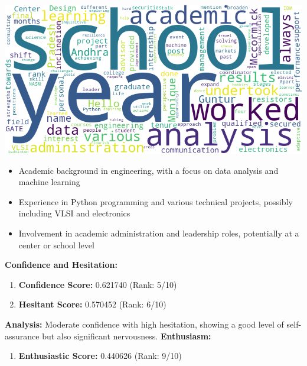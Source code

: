 \documentclass{article}
\begin{document}
\begin{center}
    \includegraphics[width=1\columnwidth]{images/wordcloud_4.png}
\end{center}
\begin{itemize}
    \item Academic background in engineering, with a focus on data analysis and machine learning
    \item Experience in Python programming and various technical projects, possibly including VLSI and electronics
    \item Involvement in academic administration and leadership roles, potentially at a center or school level
\end{itemize}
\vspace{0.1in}
\large{\textbf{Confidence and Hesitation:}}
\begin{tcolorbox}[title=Confidence and Hesitant Scores]
    \begin{enumerate}
        \item \textbf{Confidence Score:} \textcolor{green!50!black}{0.621740} (Rank: 5/10)
        \item \textbf{Hesitant Score:} \textcolor{red!70!black}{0.570452} (Rank: 6/10)
    \end{enumerate}
\end{tcolorbox}
    \textbf{Analysis:} Moderate confidence with high hesitation, showing a good level of self-assurance but also significant nervousness.
    \vspace{0.1in}
\large{\textbf{Enthusiasm:}}
\begin{tcolorbox}[colback=cyan!5!white,colframe=cyan!75!black,title=Enthusiastic Score]
    \begin{enumerate}
        \item \textbf{Enthusiastic Score:} \textcolor{orange!70!black}{0.440626} (Rank: 9/10)
    \end{enumerate}
\end{tcolorbox}
\end{document}
